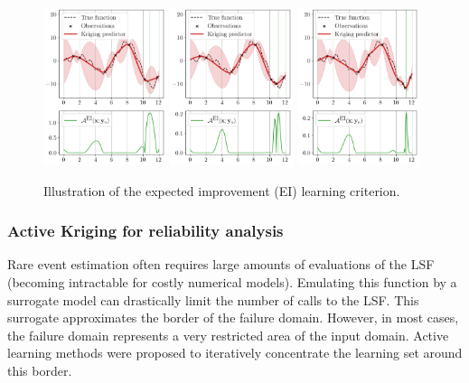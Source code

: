 \begin{figure}[ht]
    \centering
    \includegraphics[width=0.32\textwidth]{../numerical_experiments/chapter1/figures/bayesian_opt_0.png}
    \includegraphics[width=0.32\textwidth]{../numerical_experiments/chapter1/figures/bayesian_opt_1.png}
    \includegraphics[width=0.32\textwidth]{../numerical_experiments/chapter1/figures/bayesian_opt_2.png}
    \caption{Illustration of the expected improvement (EI) learning criterion.}
    \label{fig:EGO_1D}
\end{figure}

\subsubsection{Active Kriging for reliability analysis}
Rare event estimation often requires large amounts of evaluations of the LSF (becoming intractable for costly numerical models). 
Emulating this function by a surrogate model can drastically limit the number of calls to the LSF. 
This surrogate approximates the border of the failure domain. 
However, in most cases, the failure domain represents a very restricted area of the input domain. 
Active learning methods were proposed to iteratively concentrate the learning set around this border. 

